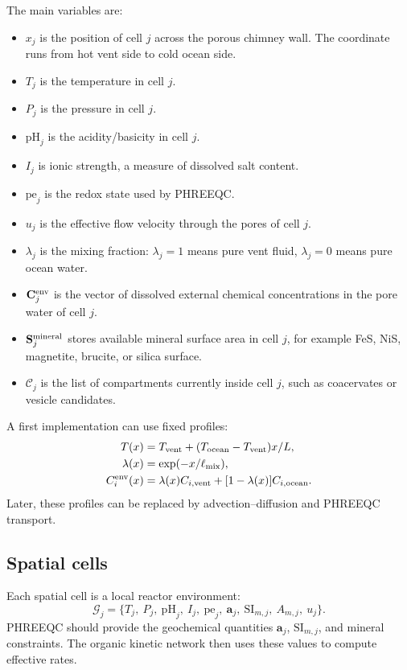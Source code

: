\documentclass[11pt]{article}
\begin{document}
The main variables are:
\begin{itemize}
  \item $x_j$ is the position of cell $j$ across the porous chimney wall. The
  coordinate runs from hot vent side to cold ocean side.
  \item $T_j$ is the temperature in cell $j$.
  \item $P_j$ is the pressure in cell $j$.
  \item $\mathrm{pH}_j$ is the acidity/basicity in cell $j$.
  \item $I_j$ is ionic strength, a measure of dissolved salt content.
  \item $\mathrm{pe}_j$ is the redox state used by PHREEQC.
  \item $u_j$ is the effective flow velocity through the pores of cell $j$.
  \item $\lambda_j$ is the mixing fraction: $\lambda_j=1$ means pure vent
  fluid, $\lambda_j=0$ means pure ocean water.
  \item $\mathbf{C}^{\rm env}_j$ is the vector of dissolved external chemical
  concentrations in the pore water of cell $j$.
  \item $\mathbf{S}^{\rm mineral}_j$ stores available mineral surface area in
  cell $j$, for example FeS, NiS, magnetite, brucite, or silica surface.
  \item $\mathcal{C}_j$ is the list of compartments currently inside cell $j$,
  such as coacervates or vesicle candidates.
\end{itemize}

A first implementation can use fixed profiles:
\begin{align}
T(x) &= T_{\rm vent} + (T_{\rm ocean}-T_{\rm vent})x/L,\\
\lambda(x) &= \exp(-x/\ell_{\rm mix}),\\
C_i^{\rm env}(x) &= \lambda(x)C_{i,\rm vent} + [1-\lambda(x)]C_{i,\rm ocean}.
\end{align}
Later, these profiles can be replaced by advection--diffusion and PHREEQC
transport.

\subsection{Spatial cells}

Each spatial cell is a local reactor environment:
\begin{equation}
\mathcal{G}_j
=
\{
T_j,\ P_j,\ \mathrm{pH}_j,\ I_j,\ \mathrm{pe}_j,\ \mathbf{a}_j,\ 
\mathrm{SI}_{m,j},\ A_{m,j},\ u_j
\}.
\end{equation}
PHREEQC should provide the geochemical quantities $\mathbf{a}_j$,
$\mathrm{SI}_{m,j}$, and mineral constraints. The organic kinetic network then
uses these values to compute effective rates.
\end{document}
